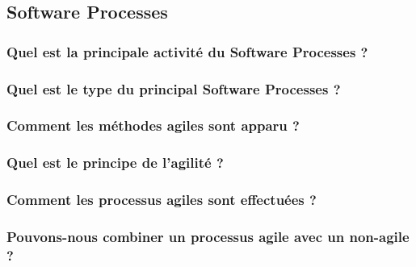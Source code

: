 \subsection{Software Processes}

\subsubsection{Quel est la principale activité du Software Processes ?}

\subsubsection{Quel est le type du principal Software Processes ?}
\subsubsection{Comment les méthodes agiles sont apparu ?}
\subsubsection{Quel est le principe de l'agilité ?}
\subsubsection{Comment les processus agiles sont effectuées ?}
\subsubsection{Pouvons-nous combiner un processus agile avec un non-agile ?}
